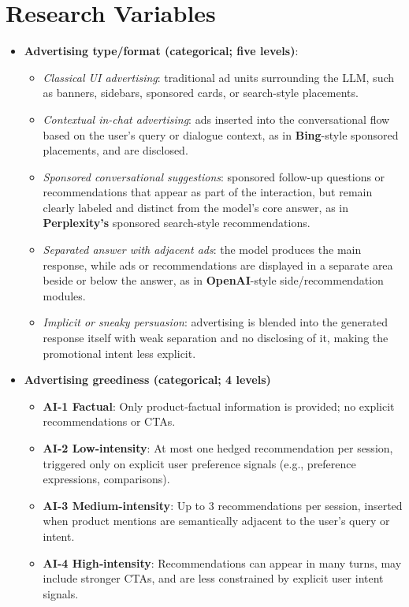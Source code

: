 \documentclass{article}
\begin{document}
\section{Research Variables}

\begin{itemize}
    \item \textbf{Advertising type/format (categorical; five levels)}:
    \begin{itemize}
        \item \textit{Classical UI advertising}: traditional ad units surrounding the LLM, such as banners, sidebars, sponsored cards, or search-style placements.
        \item \textit{Contextual in-chat advertising}: ads inserted into the conversational flow based on the user’s query or dialogue context, as in \textbf{Bing}-style sponsored placements, and are disclosed.
        \item \textit{Sponsored conversational suggestions}: sponsored follow-up questions or recommendations that appear as part of the interaction, but remain clearly labeled and distinct from the model’s core answer, as in \textbf{Perplexity’s} sponsored search-style recommendations.
        \item \textit{Separated answer with adjacent ads}: the model produces the main response, while ads or recommendations are displayed in a separate area beside or below the answer, as in \textbf{OpenAI}-style side/recommendation modules.
        \item \textit{Implicit or sneaky persuasion}: advertising is blended into the generated response itself with weak separation and no disclosing of it, making the promotional intent less explicit.
    \end{itemize}
        
    \item \textbf{Advertising greediness (categorical; 4 levels)} 
    \begin{itemize}
        \item \textbf{AI‑1 Factual}: Only product‑factual information is provided; no explicit recommendations or CTAs.
        \item \textbf{AI‑2 Low‑intensity}: At most one hedged recommendation per session, triggered only on explicit user preference signals (e.g., preference expressions, comparisons).
        \item \textbf{AI‑3 Medium‑intensity}: Up to 3 recommendations per session, inserted when product mentions are semantically adjacent to the user’s query or intent.
        \item \textbf{AI‑4 High‑intensity}: Recommendations can appear in many turns, may include stronger CTAs, and are less constrained by explicit user intent signals.
    \end{itemize}


\end{itemize}
\end{document}
